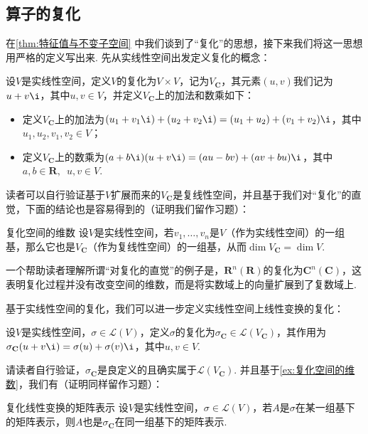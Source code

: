 \subsection{算子的复化}

在\autoref{thm:特征值与不变子空间} 中我们谈到了``复化''的思想，接下来我们将这一思想用严格的定义写出来. 先从实线性空间出发定义复化的概念：

\begin{definition}{}{}
    设$V$是实线性空间，定义$V$的复化为$V\times V$，记为$V_{\mathbf{C}}$，其元素$(u,v)$我们记为$u+v\i$，其中$u,v\in V$，并定义$V_{\mathbf{C}}$上的加法和数乘如下：
    \begin{itemize}
        \item 定义$V_{\mathbf{C}}$上的加法为$(u_1+v_1\i)+(u_2+v_2\i)=(u_1+u_2)+(v_1+v_2)\i$，其中$u_1,u_2,v_1,v_2\in V$；
        \item 定义$V_{\mathbf{C}}$上的数乘为$(a+b\i)(u+v\i)=(au-bv)+(av+bu)\i$，其中$a,b\in\mathbf{R},\enspace u,v\in V$.
    \end{itemize}
\end{definition}

读者可以自行验证基于$V$扩展而来的$V_{\mathbf{C}}$是复线性空间，并且基于我们对``复化''的直觉，下面的结论也是容易得到的（证明我们留作习题）：

\begin{example}{}{复化空间的维数}
    设$V$是实线性空间，若$v_1,\ldots,v_n$是$V$（作为实线性空间）的一组基，那么它也是$V_{\mathbf{C}}$（作为复线性空间）的一组基，从而$\dim V_{\mathbf{C}}=\dim V$.
\end{example}

一个帮助读者理解所谓``对复化的直觉''的例子是，$\mathbf{R}^n(\mathbf{R})$的复化为$\mathbf{C}^n(\mathbf{C})$，这表明复化过程并没有改变空间的维数，而是将实数域上的向量扩展到了复数域上.

基于实线性空间的复化，我们可以进一步定义实线性空间上线性变换的复化：

\begin{definition}{}{}
    设$V$是实线性空间，$\sigma\in \mathcal{L}(V)$，定义$\sigma$的复化为$\sigma_{\mathbf{C}}\in \mathcal{L}(V_{\mathbf{C}})$，其作用为$\sigma_{\mathbf{C}}(u+v\i)=\sigma(u)+\sigma(v)\i$，其中$u,v\in V$.
\end{definition}

请读者自行验证，$\sigma_{\mathbf{C}}$是良定义的且确实属于$\mathcal{L}(V_{\mathbf{C}})$. 并且基于\autoref{ex:复化空间的维数}，我们有（证明同样留作习题）：

\begin{example}{}{复化线性变换的矩阵表示}
    设$V$是实线性空间，$\sigma\in \mathcal{L}(V)$，若$A$是$\sigma$在某一组基下的矩阵表示，则$A$也是$\sigma_{\mathbf{C}}$在同一组基下的矩阵表示.
\end{example}

